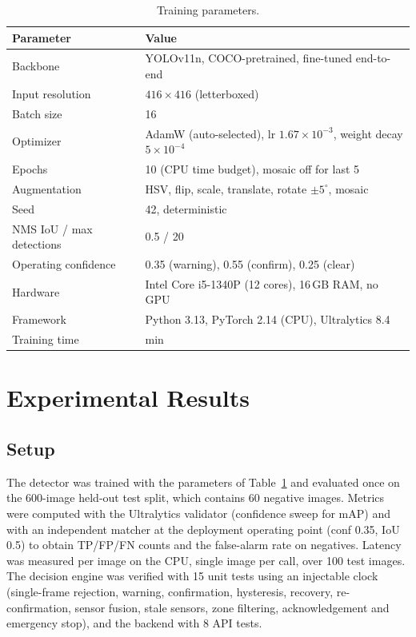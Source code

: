 \documentclass[conference]{IEEEtran}
\begin{document}
\begin{table}[t]
\caption{Training parameters.}
\label{tab:train}
\centering
\footnotesize
\begin{tabular}{p{2.4cm}p{5.0cm}}
\toprule
\textbf{Parameter} & \textbf{Value} \\
\midrule
Backbone & YOLOv11n, COCO-pretrained, fine-tuned end-to-end \\
Input resolution & $416\times416$ (letterboxed) \\
Batch size & 16 \\
Optimizer & AdamW (auto-selected), lr $1.67\times10^{-3}$, weight decay $5\times10^{-4}$ \\
Epochs & 10 (CPU time budget), mosaic off for last 5 \\
Augmentation & HSV, flip, scale, translate, rotate $\pm5^{\circ}$, mosaic \\
Seed & 42, deterministic \\
NMS IoU / max detections & 0.5 / 20 \\
Operating confidence & 0.35 (warning), 0.55 (confirm), 0.25 (clear) \\
Hardware & Intel Core i5-1340P (12 cores), 16\,GB RAM, no GPU \\
Framework & Python 3.13, PyTorch 2.14 (CPU), Ultralytics 8.4 \\
Training time & \TRAINmin{} min \\
\bottomrule
\end{tabular}
\end{table}

\section{Experimental Results}\label{sec:results}
\subsection{Setup}
The detector was trained with the parameters of Table~\ref{tab:train} and evaluated once on the 600-image held-out test split, which contains 60 negative images. Metrics were computed with the Ultralytics validator (confidence sweep for mAP) and with an independent matcher at the deployment operating point (conf 0.35, IoU 0.5) to obtain TP/FP/FN counts and the false-alarm rate on negatives. Latency was measured per image on the CPU, single image per call, over 100 test images. The decision engine was verified with 15 unit tests using an injectable clock (single-frame rejection, warning, confirmation, hysteresis, recovery, re-confirmation, sensor fusion, stale sensors, zone filtering, acknowledgement and emergency stop), and the backend with 8 API tests.
\end{document}
